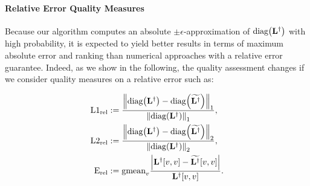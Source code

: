 \paragraph{Relative Error Quality Measures}
Because our algorithm computes an absolute $\pm\epsilon$-approximation of
$\diag{\Linv}$ with high probability, it is expected to yield better
results in terms of maximum absolute error and ranking than numerical approaches
with a relative error guarantee. Indeed, as we show in the following,
the quality assessment changes if we consider quality measures on a relative
error such as:

\begin{align*}
\lonerel &:= \frac{\onenorm{\diag{\Linv} - \diag{\Linvapx}}}{\onenorm{\diag{\Linv}}},\\
\ltworel &:= \frac{\twonorm{\diag{\Linv} - \diag{\Linvapx}}}{\twonorm{\diag{\Linv}}},\\
\erel &:= \text{gmean}_v\frac{\left|\Linv[v, v] - \Linvapx[v, v]\right|}{\Linv[v, v]}.
\end{align*}

